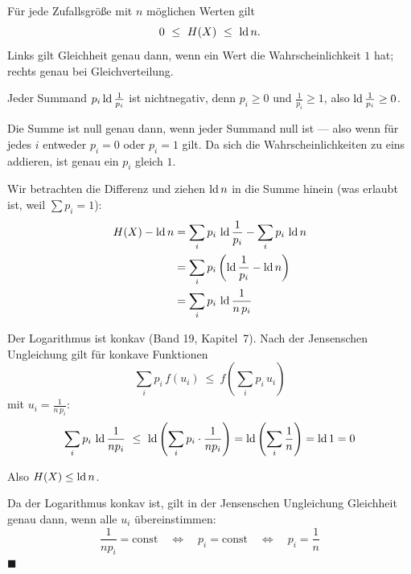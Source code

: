 \begin{merksatz}
Für jede Zufallsgröße mit $n$ möglichen Werten gilt
\[ 0 \ \le\ \Ent(X) \ \le\ \lb n . \]
Links gilt Gleichheit genau dann, wenn ein Wert die Wahrscheinlichkeit $1$ hat; rechts genau bei Gleichverteilung.

Jeder Summand $p_i\operatorname{ld}\frac{1}{p_i}$ ist nichtnegativ, denn $p_i \ge 0$ und $\frac{1}{p_i} \ge 1$, also $\operatorname{ld}\frac{1}{p_i}\ge0$.

Die Summe ist null genau dann, wenn jeder Summand null ist --- also wenn für jedes $i$ entweder $p_i=0$ oder $p_i=1$ gilt. Da sich die Wahrscheinlichkeiten zu eins addieren, ist genau ein $p_i$ gleich $1$. \checkmark

Wir betrachten die Differenz und ziehen $\operatorname{ld} n$ in die Summe hinein (was erlaubt ist, weil $\sum p_i = 1$):
\begin{align*}
H(X) - \operatorname{ld} n &= \sum_i p_i\,\operatorname{ld}\frac{1}{p_i} - \sum_i p_i\,\operatorname{ld} n\\
&= \sum_i p_i\left(\operatorname{ld}\frac{1}{p_i} - \operatorname{ld} n\right)\\
&= \sum_i p_i\,\operatorname{ld}\frac{1}{n\,p_i}
\end{align*}

Der Logarithmus ist konkav (Band 19, Kapitel~7). Nach der Jensenschen Ungleichung gilt für konkave Funktionen
\[ \sum_i p_i\,f(u_i) \ \le\ f\left(\sum_i p_i\,u_i\right) \]
mit $u_i = \frac{1}{n\,p_i}$:
\[ \sum_i p_i\,\lb\frac{1}{np_i} \ \le\ \lb\left(\sum_i p_i\cdot\frac{1}{np_i}\right) = \lb\left(\sum_i \frac1n\right) = \lb 1 = 0 \]

Also $H(X) \le \operatorname{ld} n$. \checkmark

Da der Logarithmus  konkav ist, gilt in der Jensenschen Ungleichung Gleichheit genau dann, wenn alle $u_i$ übereinstimmen:
\[ \frac{1}{np_i} = \text{const} \quad\Longleftrightarrow\quad p_i = \text{const} \quad\Longleftrightarrow\quad p_i = \frac1n \]
$\blacksquare$

\begin{center}
\begin{minipage}{0.88\textwidth}
\end{minipage}
\end{center}
\end{merksatz}


